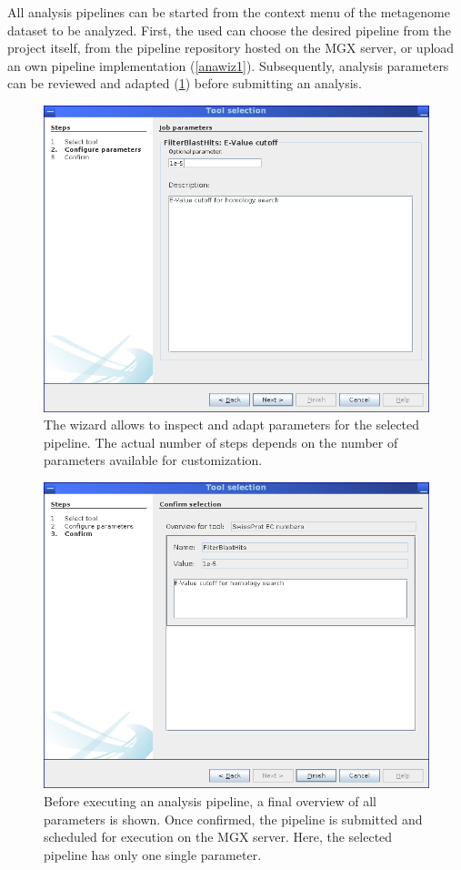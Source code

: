 All analysis pipelines can be started from the context menu of the metagenome dataset to be analyzed. First,
the used can choose the desired pipeline from the project itself, from the pipeline repository hosted on the
MGX server, or upload an own pipeline implementation (\ref{anawiz1}). Subsequently, analysis parameters
can be reviewed and adapted (\ref{anawiz2}) before submitting an analysis.

\begin{figure}[H]
\centering
\includegraphics[width=.8\textwidth]{img/mgx/analysiswiz2}
\caption[Analysis parameters]{The wizard allows to inspect and adapt parameters for the selected pipeline. The actual
number of steps depends on the number of parameters available for customization.}
\label{anawiz2}
\end{figure}

\begin{figure}[H]
\centering
\includegraphics[width=.8\textwidth]{img/mgx/analysiswiz3}
\caption[Parameter overview]{Before executing an analysis pipeline, a final overview of all parameters is shown. Once
confirmed, the pipeline is submitted and scheduled for execution on the MGX server. Here, the selected pipeline has
only one single parameter.}
\label{anawiz3}
\end{figure}

